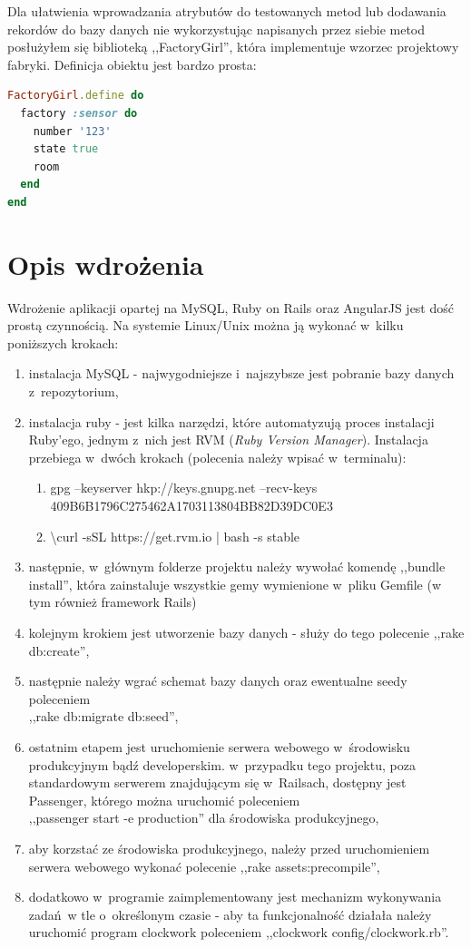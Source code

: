 \documentclass[eng,oneside]{mgr}
\begin{document}
Dla ułatwienia wprowadzania atrybutów do testowanych metod lub dodawania rekordów do bazy danych nie wykorzystując napisanych przez siebie metod posłużyłem się biblioteką ,,FactoryGirl'', która implementuje wzorzec projektowy fabryki. Definicja obiektu jest bardzo prosta:

\begin{lstlisting}[language=Ruby, caption={Definicja FactoryGirl.}]
FactoryGirl.define do
  factory :sensor do
    number '123'
    state true
    room
  end
end
\end{lstlisting}

\chapter{Opis wdrożenia} %
\label{cha:instrukcja_wdro_enia}
Wdrożenie aplikacji opartej na MySQL, Ruby on Rails oraz AngularJS jest dość prostą czynnością. Na systemie Linux/Unix można ją wykonać w~kilku poniższych krokach:
\begin{enumerate}
  \item instalacja MySQL - najwygodniejsze i~najszybsze jest pobranie bazy danych z~repozytorium,
  \item instalacja ruby - jest kilka narzędzi, które automatyzują proces instalacji Ruby'ego, jednym z~nich jest RVM (\emph{Ruby Version Manager}). Instalacja przebiega w~dwóch krokach (polecenia należy wpisać w~terminalu):
  \begin{enumerate}
    \item gpg --keyserver hkp://keys.gnupg.net --recv-keys 409B6B1796C275462A1703113804BB82D39DC0E3 
    \item \textbackslash{}curl -sSL https://get.rvm.io | bash -s stable
  \end{enumerate}
  \item następnie, w~głównym folderze projektu należy wywołać komendę ,,bundle install'', która zainstaluje wszystkie gemy wymienione w~pliku Gemfile (w tym również framework Rails)
  \item kolejnym krokiem jest utworzenie bazy danych - służy do tego polecenie ,,rake db:create'',
  \item następnie należy wgrać schemat bazy danych oraz ewentualne seedy poleceniem\\,,rake db:migrate db:seed'',
  \item ostatnim etapem jest uruchomienie serwera webowego w~środowisku produkcyjnym bądź developerskim. w~przypadku tego projektu, poza standardowym serwerem znajdującym się w~Railsach, dostępny jest Passenger, którego można uruchomić poleceniem\\,,passenger start -e production'' dla środowiska produkcyjnego,
  \item aby korzstać ze środowiska produkcyjnego, należy przed uruchomieniem serwera webowego wykonać polecenie ,,rake assets:precompile'',
  \item dodatkowo w~programie zaimplementowany jest mechanizm wykonywania zadań w tle o~określonym czasie - aby ta funkcjonalność działała należy uruchomić program clockwork poleceniem ,,clockwork config/clockwork.rb''.
\end{enumerate}
\end{document}
